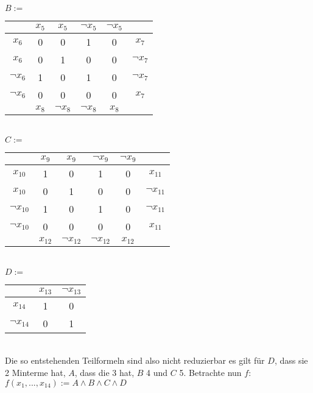 \documentclass[a4paper,10pt]{article}
\begin{document}
\begin{enumerate}[a)]
$B :=$
\begin{tabular}{|c|c|c|c|c|c|}
	\hline & $x_5$ & $x_5$ & $\neg x_5$ & $\neg x_5$ & \\
	\hline $x_6$ & 0 & 0 & 1 & 0 & $x_7$\\
	\hline $x_6$ &0 & 1 & 0 & 0 & $\neg x_7$\\
	\hline $\neg x_6$ & 1 & 0 & 1 & 0 & $\neg x_7$\\
	\hline $\neg x_6$& 0 & 0 & 0 & 0 & $x_7$\\
	\hline &$x_8$ &$\neg x_8$ & $\neg x_8$& $x_8$&\\
	\hline
\end{tabular}\\
$C :=$
\begin{tabular}{|c|c|c|c|c|c|}
	\hline & $x_9$ & $x_9$ & $\neg x_9$ & $\neg x_9$ & \\
	\hline $x_{10}$ & 1 & 0 & 1 & 0 & $x_{11}$\\
	\hline $x_{10}$ &0 & 1 & 0 & 0 & $\neg x_{11}$\\
	\hline $\neg x_{10}$ & 1 & 0 & 1 & 0 & $\neg x_{11}$\\
	\hline $\neg x_{10}$& 0 & 0 & 0 & 0 & $x_{11}$\\
	\hline &$x_{12}$ &$\neg x_{12}$ & $\neg x_{12}$& $x_{12}$&\\
	\hline
\end{tabular}\\
$D :=$ 
\begin{tabular}{|c|c|c|}
	\hline & $x_{13}$ & $\neg x_{13}$ \\
	\hline $x_{14}$ & 1 & 0\\
	\hline $\neg x_{14}$ &0 & 1 \\
	\hline
\end{tabular}\\
Die so entstehenden Teilformeln sind also nicht reduzierbar es gilt für $D$, dass sie 2 Minterme hat, $A$, dass die 3 hat, $B$ 4 und $C$ 5. Betrachte nun $f$:\\
$f(x_1,...,x_{14}) := A\wedge B\wedge C\wedge D$

\end{enumerate}
\end{document}
